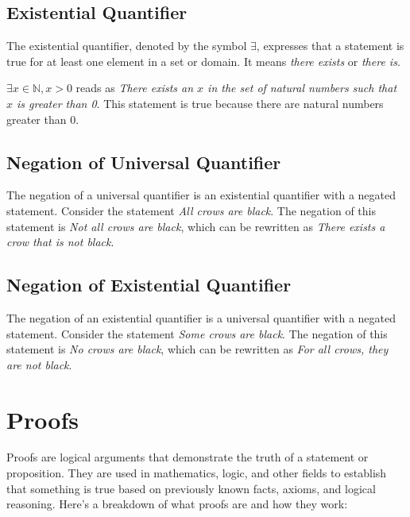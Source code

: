 \documentclass{article}
\theoremstyle{mytheoremstyle}
\theoremstyle{mytheoremstyle}
\theoremstyle{myexamplestyle}
\begin{document}
\subsection{Existential Quantifier}
\begin{definition}
    The existential quantifier, denoted by the symbol $\exists$,
    expresses that a statement is true for at least one element in a
    set or domain. It means \emph{there exists} or \emph{there is}.
\end{definition}


\begin{example}
    $\exists x \in \mathbb{N}, x > 0$ reads as \emph{There
        exists an $x$ in the set of natural numbers such that $x$ is greater
        than 0}. This statement is true because there are natural
    numbers greater than 0.
\end{example}

\subsection{Negation of Universal Quantifier}

The negation of a universal quantifier is an existential quantifier
with a negated statement. Consider the statement \emph{All crows are
    black}. The negation of this statement is \emph{Not all crows
    are black}, which can be rewritten as \emph{There exists a crow that is not black}.

\subsection{Negation of Existential Quantifier}

The negation of an existential quantifier is a universal quantifier
with a negated statement. Consider the statement \emph{Some crows
    are black}. The negation of this statement is \emph{No crows are
    black}, which can be rewritten as \emph{For all crows, they are not black}.

\newpage

\section{Proofs}

Proofs are logical arguments that demonstrate the truth of a
statement or proposition. They are used in mathematics, logic, and
other fields to establish that something is true based on previously
known facts, axioms, and logical reasoning. Here's a breakdown of
what proofs are and how they work:
\end{document}
